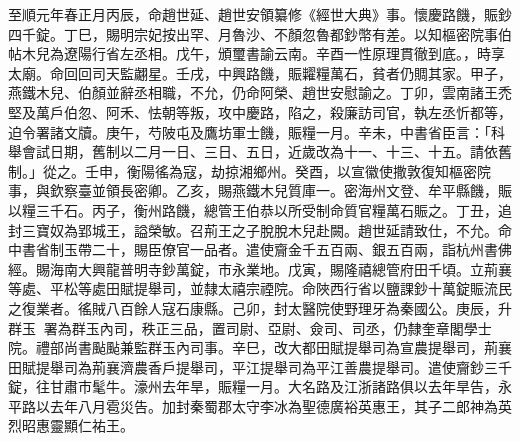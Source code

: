 
\begin{pinyinscope}

 至順元年春正月丙辰，命趙世延、趙世安領纂修《經世大典》事。懷慶路饑，賑鈔四千錠。丁巳，賜明宗妃按出罕、月魯沙、不顏忽魯都鈔幣有差。以知樞密院事伯帖木兒為遼陽行省左丞相。戊午，頒璽書諭云南。辛酉一性原理貫徹到底。，時享太廟。命回回司天監翽星。壬戌，中興路饑，賑糶糧萬石，貧者仍賙其家。甲子，燕鐵木兒、伯顏並辭丞相職，不允，仍命阿榮、趙世安慰諭之。丁卯，雲南諸王禿堅及萬戶伯忽、阿禾、怯朝等叛，攻中慶路，陷之，殺廉訪司官，執左丞忻都等，迫令署諸文牘。庚午，芍陂屯及鷹坊軍士饑，賑糧一月。辛未，中書省臣言：「科舉會試日期，舊制以二月一日、三日、五日，近歲改為十一、十三、十五。請依舊制。」從之。壬申，衡陽徭為寇，劫掠湘鄉州。癸酉，以宣徽使撒敦復知樞密院事，與欽察臺並領長密卿。乙亥，賜燕鐵木兒質庫一。密海州文登、牟平縣饑，賑以糧三千石。丙子，衡州路饑，總管王伯恭以所受制命質官糧萬石賑之。丁丑，追封三寶奴為郢城王，謚榮敏。召荊王之子脫脫木兒赴闕。趙世延請致仕，不允。命中書省制玉帶二十，賜臣僚官一品者。遣使齎金千五百兩、銀五百兩，詣杭州書佛經。賜海南大興龍普明寺鈔萬錠，市永業地。戊寅，賜隆禧總管府田千頃。立荊襄等處、平松等處田賦提舉司，並隸太禧宗禋院。命陜西行省以鹽課鈔十萬錠賑流民之復業者。徭賊八百餘人寇石康縣。己卯，封太醫院使野理牙為秦國公。庚辰，升群玉署為群玉內司，秩正三品，置司尉、亞尉、僉司、司丞，仍隸奎章閣學士院。禮部尚書颭颭兼監群玉內司事。辛巳，改大都田賦提舉司為宣農提舉司，荊襄田賦提舉司為荊襄濟農香戶提舉司，平江提舉司為平江善農提舉司。遣使齎鈔三千錠，往甘肅市髦牛。濠州去年旱，賑糧一月。大名路及江浙諸路俱以去年旱告，永平路以去年八月雹災告。加封秦蜀郡太守李冰為聖德廣裕英惠王，其子二郎神為英烈昭惠靈顯仁祐王。




\end{pinyinscope}
